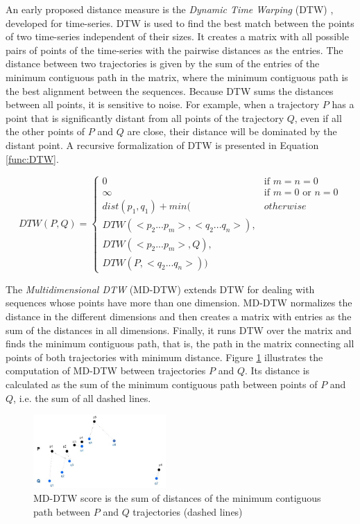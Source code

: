 An early proposed distance measure is the \emph{Dynamic Time Warping} (DTW) \cite{berndt1994using}, developed for time-series. DTW is used to find the best match between the points of two time-series independent of their sizes. It creates a matrix with all possible pairs of points of the time-series with the pairwise distances as the entries.
The distance between two trajectories is given by the sum of the entries of the minimum contiguous path in the matrix, where the minimum contiguous path is the best alignment between the sequences. Because DTW sums the distances between all points, it is sensitive to noise. For example, when a trajectory $P$ has a point that is significantly distant from all points of the trajectory $Q$, even if all the other points of $P$ and $Q$ are close, their distance will be dominated by the distant point. A recursive formalization of DTW is presented in Equation \ref{func:DTW}.

\begin{equation}
\label{func:DTW}
  DTW(P, Q) = 
    \begin{cases} 
        0 & \text{if } m = n = 0\\ 
      \infty & \text{if } m = 0 \text{ or } n = 0\\ 
      dist(p_1, q_1) + min( & otherwise\\
      DTW(<p_2...p_m>,<q_2...q_n>),\\
      DTW(<p_2...p_m>, Q), \\
      DTW(P, <q_2...q_n>)) &
    \end{cases}
\end{equation}

The \emph{Multidimensional DTW} (MD-DTW) \cite{ten2007multi} extends DTW for dealing with sequences whose points have more than one dimension. MD-DTW normalizes the distance in the different dimensions and then creates a matrix with entries as the sum of the distances in all dimensions. Finally, it runs DTW over the matrix and finds the minimum contiguous path, that is, the path in the matrix connecting all points of both trajectories with minimum distance. Figure \ref{fig:related_trajes_DTW} illustrates the computation of MD-DTW between trajectories $P$ and $Q$. Its distance is calculated as the sum of the minimum contiguous path between points of $P$ and $Q$, i.e. the sum of all dashed lines.

\begin{figure}[ht]
\centering
\includegraphics[width=0.45\textwidth]{Related_Works/related_trajes-DTW.jpg}
\caption{\label{fig:related_trajes_DTW}MD-DTW score is the sum of distances of the minimum contiguous path between $P$ and $Q$ trajectories (dashed lines)}
\end{figure}


